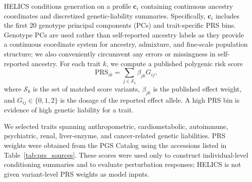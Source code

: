 \documentclass{article}
\begin{document}
HELICS conditions generation on a profile \(\boldsymbol c_i\) containing continuous ancestry coordinates and discretized genetic-liability summaries. Specifically, \(\boldsymbol c_i\) includes the first 20 genotype principal components (PCs) and trait-specific PRS bins. Genotype PCs are used rather than self-reported ancestry labels as they provide a continuous coordinate system for ancestry, admixture, and fine-scale population structure; we also conveniently circumvent any errors or missingness in self-reported ancestry. For each trait \(k\), we compute a published polygenic risk score
\[
\mathrm{PRS}_{ik}
=
\sum_{j\in\mathcal S_k}
\beta_{jk}G_{ij},
\]
where \(\mathcal S_k\) is the set of matched score variants, \(\beta_{jk}\) is the published effect weight, and \(G_{ij}\in\{0,1,2\}\) is the dosage of the reported effect allele. A high PRS bin is evidence of high genetic liability for a trait.

We selected traits spanning anthropometric, cardiometabolic, autoimmune, psychiatric, renal, liver-enzyme, and cancer-related genetic liabilities. PRS weights were obtained from the PGS Catalog using the accessions listed in Table~\ref{tab:prs_sources}. These scores were used only to construct individual-level conditioning summaries and to evaluate perturbation responses; HELICS is not given variant-level PRS weights as model inputs.
\end{document}
